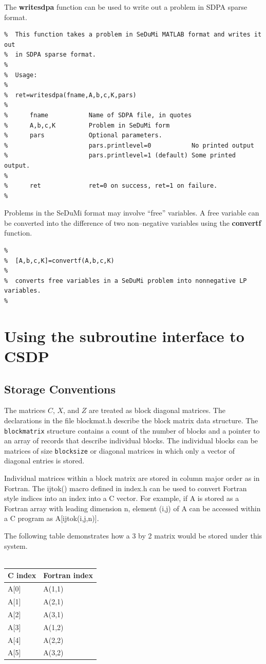 \documentclass{article}
\begin{document}
\newpage
The {\bf writesdpa} function can be used to write out a problem in SDPA
sparse format.

\begin{verbatim}
%  This function takes a problem in SeDuMi MATLAB format and writes it out 
%  in SDPA sparse format.  
%
%  Usage:
%
%  ret=writesdpa(fname,A,b,c,K,pars)
%
%      fname           Name of SDPA file, in quotes
%      A,b,c,K         Problem in SeDuMi form
%      pars            Optional parameters.
%                      pars.printlevel=0           No printed output  
%                      pars.printlevel=1 (default) Some printed output.
%      
%      ret             ret=0 on success, ret=1 on failure.
%
\end{verbatim}

Problems in the SeDuMi format may involve ``free'' variables.  A free variable
can be converted into the difference of two non--negative variables using the
{\bf convertf} function.

\begin{verbatim}
% 
%  [A,b,c,K]=convertf(A,b,c,K)
% 
%  converts free variables in a SeDuMi problem into nonnegative LP variables.
% 
\end{verbatim}
\section*{Using the subroutine interface to CSDP}
\subsection*{Storage Conventions}
The matrices $C$, $X$, and $Z$ are treated as block diagonal matrices.
The declarations in the file blockmat.h describe the block matrix
data structure.  The {\tt blockmatrix} structure contains a count of
the number of blocks and a pointer to an array of records that 
describe individual blocks.  The individual blocks can be matrices
of size {\tt blocksize} or diagonal matrices in which only a vector
of diagonal entries is stored.  

Individual matrices within a block matrix are stored in column major
order as in Fortran.  The ijtok() macro defined in index.h can be used
to convert Fortran style indices into an index into a C vector.  For
example, if A is stored as a Fortran array with leading dimension
n, element (i,j) of A can be accessed within a C program as
A[ijtok(i,j,n)].

The following table  demonstrates how a 3 by 2 matrix would
be stored under this system.  
\\
\\
\begin{tabular}{|l|l|} \hline
C index & Fortran index \\ \hline
A[0] & A(1,1) \\ \hline
A[1] & A(2,1) \\ \hline
A[2] & A(3,1) \\ \hline
A[3] & A(1,2) \\ \hline
A[4] & A(2,2) \\ \hline
A[5] & A(3,2) \\ \hline
\end{tabular}
\end{document}
